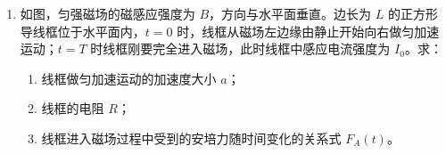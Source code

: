 \documentclass[\gkver]{gaokaozhenti}
\begin{document}
\begin{enumerate}
\begin{enumerate}
	B．保持钩码个数不变，增加配重片，重复实验得到几组数据；

	C．点击“开始记录”并释放小车，完成运动后点击“停止记录”，得到 $v-t$ 图像。
	\item
	某同学不使用图中的传感器，而是在轨道 A 处固定一光电门传感器，实验时改变配重片数目，记录小车总质量 $m$，由静止释放小车，测出小车过 A 时的瞬时速度 $v$，由实验数据得到 $v^{2}-\frac{1}{m}$ 图线验证加速度与质量的关系。实验中每次释放小车的位置（选填“必须相同”或“可以不同”），原因是。
\end{enumerate}
\onepicture[align=right, w=10.84cm]{}

\item
如图，匀强磁场的磁感应强度为 $B$，方向与水平面垂直。边长为 $L$ 的正方形导线框位于水平面内，$t=0$ 时，线框从磁场左边缘由静止开始向右做匀加速运动；$t=T$ 时线框刚要完全进入磁场，此时线框中感应电流强度为 $I_{0}$。求：
\begin{enumerate}
	\item
	线框做匀加速运动的加速度大小 $a$；
	\item
	线框的电阻 $R$；
	\item
	线框进入磁场过程中受到的安培力随时间变化的关系式 $F_{A}(t)$。
\end{enumerate}
\onepicture[align=right, w=3.23cm]{}
\end{enumerate}
\end{document}
